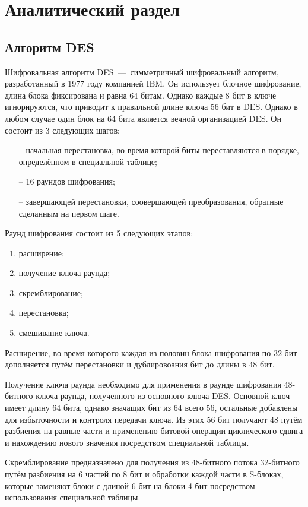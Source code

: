 \chapter{Аналитический раздел}

\section{Алгоритм DES}

Шифровальная алгоритм DES~---~симметричный шифровальный алгоритм, разработанный в 1977 году компанией IBM. 
Он использует блочное шифрование, длина блока фиксирована и равна 64 битам. 
Однако каждые 8 бит в ключе игнорируются, что приводит к правильной длине ключа 56 бит в DES. 
Однако в любом случае один блок на 64 бита является вечной организацией DES.
Он состоит из 3 следующих шагов: 
\begin{itemize}
	\item[--] начальная перестановка, во время которой биты переставляются в порядке, определённом в специальной таблице;
	\item[--] 16 раундов шифрования;
	\item[--] завершающей перестановки, соовершающей преобразования, обратные сделанным на первом шаге.
\end{itemize}

Раунд шифрования состоит из 5 следующих этапов:
\begin{enumerate}[label=\arabic*)]
	\item расширение;
	\item получение ключа раунда;
	\item скремблирование;
	\item перестановка;
	\item смешивание ключа.
\end{enumerate}

Расширение, во время которого каждая из половин блока шифрования по 32 бит дополняется путём перестановки и дублировоания бит до длины в 48 бит.

Получение ключа раунда необходимо для применения в раунде шифрования 48-битного ключа раунда, полученного из основного ключа DES.
Основной ключ имеет длину 64 бита, однако значащих бит из 64 всего 56, остальные добавлены для избыточности и контроля передачи ключа.
Из этих 56 бит получают 48 путём разбиения на равные части и применению битовой операции циклического сдвига и нахождению нового значения посредством специальной таблицы.

Скремблирование предназначено для получения из 48-битного потока 32-битного путём разбиения на 6 частей по 8 бит и обработки каждой части в S-блоках, которые заменяют блоки с длиной 6 бит на блоки 4 бит посредством использования специальной таблицы.

